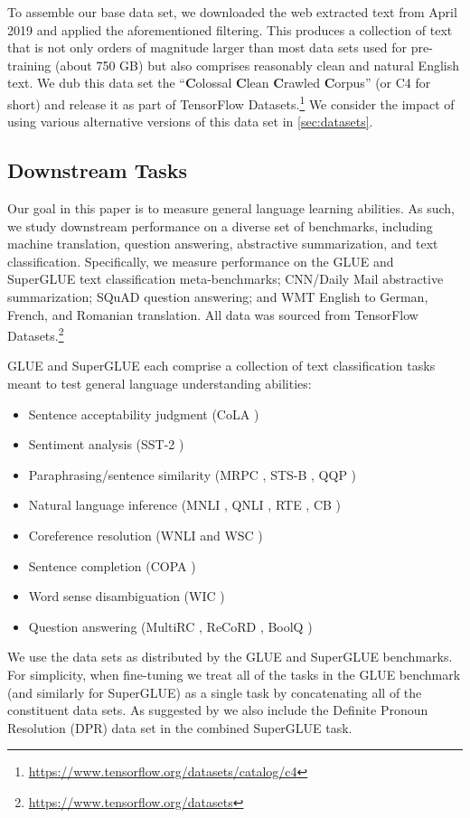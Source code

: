 \documentclass[twoside,11pt]{article}
\begin{document}
To assemble our base data set, we downloaded the web extracted text from April 2019 and applied the aforementioned filtering.
This produces a collection of text that is not only orders of magnitude larger than most data sets used for pre-training (about 750 GB) but also comprises reasonably clean and natural English text.
We dub this data set the ``\textbf{C}olossal \textbf{C}lean \textbf{C}rawled \textbf{C}orpus'' (or C4 for short) and release it as part of TensorFlow Datasets.\footnote{\url{https://www.tensorflow.org/datasets/catalog/c4}}
We consider the impact of using various alternative versions of this data set in \cref{sec:datasets}.

\subsection{Downstream Tasks}
\label{sec:tasks}

Our goal in this paper is to measure general language learning abilities.
As such, we study downstream performance on a diverse set of benchmarks, including machine translation, question answering, abstractive summarization, and text classification.
Specifically, we measure performance on the GLUE and SuperGLUE text classification meta-benchmarks; CNN/Daily Mail abstractive summarization; SQuAD question answering; and WMT English to German, French, and Romanian translation.
All data was sourced from TensorFlow Datasets.\footnote{\url{https://www.tensorflow.org/datasets}}

GLUE \citep{wang2018glue} and SuperGLUE \citep{wang2019superglue} each comprise a collection of text classification tasks meant to test general language understanding abilities:
\begin{itemize}
  \item Sentence acceptability judgment (CoLA \citep{warstadt2018neural})
  \item Sentiment analysis (SST-2 \citep{socher2013recursive})
  \item Paraphrasing/sentence similarity (MRPC \citep{dolan2005automatically}, STS-B \citep{cer2017semeval}, QQP \citep{shankar2017first})
  \item Natural language inference (MNLI \citep{williams2017broad}, QNLI \citep{rajpurkar2016squad}, RTE \citep{dagan2005pascal}, CB \citep{de2019commitmentbank})
  \item Coreference resolution (WNLI and WSC \citep{levesque2012winograd})
  \item Sentence completion (COPA \citep{roemmele2011choice})
  \item Word sense disambiguation (WIC \citep{pilehvar2018wic})
  \item Question answering (MultiRC \citep{khashabi2018looking}, ReCoRD \citep{zhang2018record}, BoolQ \citep{clark2019boolq})
\end{itemize}
We use the data sets as distributed by the GLUE and SuperGLUE benchmarks.
For simplicity, when fine-tuning we treat all of the tasks in the GLUE benchmark (and similarly for SuperGLUE) as a single task by concatenating all of the constituent data sets.
As suggested by \cite{kocijan2019surprisingly} we also include the Definite Pronoun Resolution (DPR) data set \citep{rahman2012resolving} in the combined SuperGLUE task.
\end{document}
